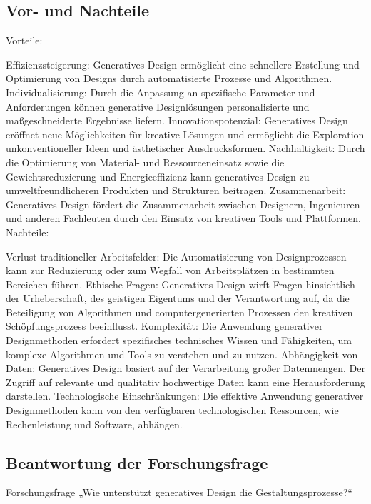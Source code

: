 \subsection*{Vor- und Nachteile}
 Vorteile:

 Effizienzsteigerung: Generatives Design ermöglicht eine schnellere Erstellung und Optimierung von Designs durch automatisierte Prozesse und Algorithmen.
 Individualisierung: Durch die Anpassung an spezifische Parameter und Anforderungen können generative Designlösungen personalisierte und maßgeschneiderte Ergebnisse liefern.
 Innovationspotenzial: Generatives Design eröffnet neue Möglichkeiten für kreative Lösungen und ermöglicht die Exploration unkonventioneller Ideen und ästhetischer Ausdrucksformen.
 Nachhaltigkeit: Durch die Optimierung von Material- und Ressourceneinsatz sowie die Gewichtsreduzierung und Energieeffizienz kann generatives Design zu umweltfreundlicheren Produkten und Strukturen beitragen.
 Zusammenarbeit: Generatives Design fördert die Zusammenarbeit zwischen Designern, Ingenieuren und anderen Fachleuten durch den Einsatz von kreativen Tools und Plattformen. \autocite{12} \autocite*{13}
 Nachteile:
 
 Verlust traditioneller Arbeitsfelder: Die Automatisierung von Designprozessen kann zur Reduzierung oder zum Wegfall von Arbeitsplätzen in bestimmten Bereichen führen.
 Ethische Fragen: Generatives Design wirft Fragen hinsichtlich der Urheberschaft, des geistigen Eigentums und der Verantwortung auf, da die Beteiligung von Algorithmen und computergenerierten Prozessen den kreativen Schöpfungsprozess beeinflusst.
 Komplexität: Die Anwendung generativer Designmethoden erfordert spezifisches technisches Wissen und Fähigkeiten, um komplexe Algorithmen und Tools zu verstehen und zu nutzen.
 Abhängigkeit von Daten: Generatives Design basiert auf der Verarbeitung großer Datenmengen. Der Zugriff auf relevante und qualitativ hochwertige Daten kann eine Herausforderung darstellen.
 Technologische Einschränkungen: Die effektive Anwendung generativer Designmethoden kann von den verfügbaren technologischen Ressourcen, wie Rechenleistung und Software, abhängen. \autocite*{13}

\subsection*{Beantwortung der Forschungsfrage}

Forschungsfrage „Wie unterstützt generatives Design die Gestaltungsprozesse?“ 

